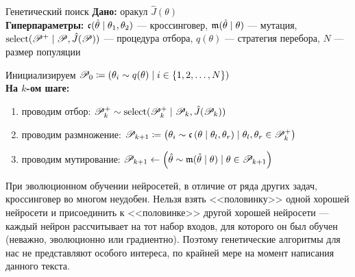 \begin{algorithm}[label=geneticsearch]{Генетический поиск}
\textbf{Дано:} оракул $\hat{J}(\theta)$ \\
\textbf{Гиперпараметры:} $\mathfrak{c}(\hat{\theta} \mid \theta_1, \theta_2)$ --- кроссинговер, $\mathfrak{m}(\hat{\theta} \mid \theta)$ --- мутация, $\mathrm{select}(\mathscr{P}^+ \mid \mathscr{P}, \hat{J}(\mathscr{P}))$ --- процедура отбора, $q(\theta)$ --- стратегия перебора, $N$ --- размер популяции

\vspace{0.3cm}
Инициализируем $\mathscr{P}_0 \coloneqq \left( \theta_i \sim q(\theta) \mid i \in \{1, 2, \dots , N \} \right)$ \\
\textbf{На $k$-ом шаге:}
\begin{enumerate}
    \item проводим отбор: $\mathscr{P}^{+}_k \sim \mathrm{select}(\mathscr{P}^{+}_k \mid \mathscr{P}_k, \hat{J}(\mathscr{P}_k))$
    \item проводим размножение: $\mathscr{P}_{k+1} \coloneqq \left( \theta_i \sim \mathfrak{c} \left( \theta \mid \theta_l, \theta_r \right) \mid \theta_l, \theta_r \in \mathscr{P}^{+}_k \right)$
    \item проводим мутирование: $\mathscr{P}_{k+1} \leftarrow \left( \hat{\theta} \sim \mathfrak{m} (\hat{\theta} \mid \theta) \mid \theta \in \mathscr{P}_{k+1} \right)$
\end{enumerate}
\end{algorithm}

\begin{remark}
При эволюционном обучении нейросетей, в отличие от ряда других задач, кроссинговер во многом неудобен. Нельзя взять <<половинку>> одной хорошей нейросети и присоединить к <<половинке>> другой хорошей нейросети --- каждый нейрон рассчитывает на тот набор входов, для которого он был обучен (неважно, эволюционно или градиентно). Поэтому генетические алгоритмы для нас не представляют особого интереса, по крайней мере на момент написания данного текста. 
\end{remark}

